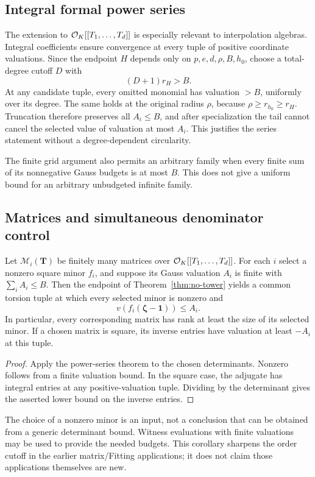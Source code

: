 \subsection{Integral formal power series}
The extension to $\mathcal O_K[[T_1,\ldots,T_d]]$ is especially relevant to interpolation algebras. Integral coefficients ensure convergence at every tuple of positive coordinate valuations. Since the endpoint $H$ depends only on $p,e,d,\rho,B,h_0$, choose a total-degree cutoff $D$ with
\[
 (D+1)r_H>B.
\]
At any candidate tuple, every omitted monomial has valuation $>B$, uniformly over its degree. The same holds at the original radius $\rho$, because $\rho\ge r_{h_0}\ge r_H$. Truncation therefore preserves all $A_i\le B$, and after specialization the tail cannot cancel the selected value of valuation at most $A_i$. This justifies the series statement without a degree-dependent circularity.

The finite grid argument also permits an arbitrary family when every finite sum of its nonnegative Gauss budgets is at most $B$. This does not give a uniform bound for an arbitrary unbudgeted infinite family.

\subsection{Matrices and simultaneous denominator control}
\begin{corollary}
\label{cor:minors}
Let $\mathcal M_i(\mathbf T)$ be finitely many matrices over
$\mathcal O_K[[T_1,\ldots,T_d]]$. For each $i$ select a nonzero square minor $f_i$, and suppose its Gauss valuation $A_i$ is finite with $\sum_iA_i\le B$. Then the endpoint of Theorem~\ref{thm:no-tower} yields a common torsion tuple at which every selected minor is nonzero and
\[
 v(f_i(\boldsymbol\zeta-\mathbf1))\le A_i.
\]
In particular, every corresponding matrix has rank at least the size of its selected minor. If a chosen matrix is square, its inverse entries have valuation at least $-A_i$ at this tuple.
\end{corollary}
\begin{proof}
Apply the power-series theorem to the chosen determinants. Nonzero follows from a finite valuation bound. In the square case, the adjugate has integral entries at any positive-valuation tuple. Dividing by the determinant gives the asserted lower bound on the inverse entries.
\end{proof}
The choice of a nonzero minor is an input, not a conclusion that can be obtained from a generic determinant bound. Witness evaluations with finite valuations may be used to provide the needed budgets. This corollary sharpens the order cutoff in the earlier matrix/Fitting applications; it does not claim those applications themselves are new.

